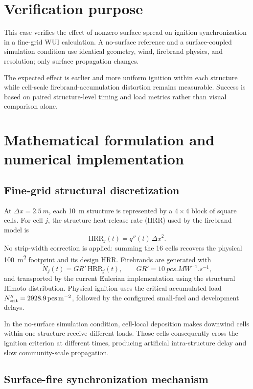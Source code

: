 \section{Verification purpose}

This case verifies the effect of nonzero surface spread on ignition synchronization in a fine-grid WUI calculation. A no-surface reference and a surface-coupled simulation condition use identical geometry, wind, firebrand physics, and resolution; only surface propagation changes.

The expected effect is earlier and more uniform ignition within each structure while cell-scale firebrand-accumulation distortion remains measurable. Success is based on paired structure-level timing and load metrics rather than visual comparison alone.

\section{Mathematical formulation and numerical implementation}

\subsection{Fine-grid structural discretization}

At \(\Delta x=\SI{2.5}{m}\), each \SI{10}{m} structure is represented by
a \(4\times4\) block of square cells. For cell \(j\), the
structure heat-release rate (HRR) used by the firebrand model is
\[
  \mathrm{HRR}_j(t)=q''(t)\,\Delta x^2.
\]
No strip-width correction is applied: summing the 16 cells recovers the
physical \SI{100}{m^2} footprint and its design HRR. Firebrands are generated with
\[
  \dot N_j(t)=GR'\,\mathrm{HRR}_j(t),\qquad
  GR'=\SI{10}{pcs.MW^{-1}.s^{-1}},
\]
and transported by the current Eulerian implementation using the structural
Himoto distribution. Physical ignition uses the critical accumulated load
\(N''_{\rm crit}=\SI{2928.9}{pcs.m^{-2}}\), followed by the configured
small-fuel and development delays.

In the no-surface simulation condition, cell-local deposition makes downwind cells within
one structure
receive different loads. Those cells consequently cross the ignition
criterion at different times, producing artificial intra-structure delay and
slow community-scale propagation.

\subsection{Surface-fire synchronization mechanism}

